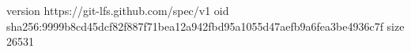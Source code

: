 version https://git-lfs.github.com/spec/v1
oid sha256:9999b8cd45dcf82f887f71bea12a942fbd95a1055d47aefb9a6fea3be4936c7f
size 26531
